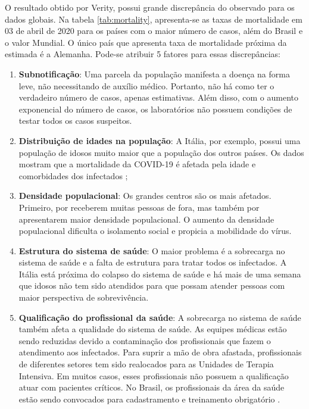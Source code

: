 \documentclass[12pt,a4papper]{article}
\begin{document}
O resultado obtido por Verity, possui grande discrepância do observado para os dados globais. Na tabela \ref{tab:mortality}, apresenta-se as taxas de mortalidade em 03 de abril de 2020 para os países com o maior número de casos, além do Brasil e o valor Mundial. O único país que apresenta taxa de mortalidade próxima da estimada é a Alemanha. Pode-se atribuir 5 fatores para essas discrepâncias:
\begin{enumerate}
    \item \textbf{Subnotificação}: Uma parcela da população manifesta a doença na forma leve, não necessitando de auxílio médico. Portanto, não há como ter o verdadeiro número de casos, apenas estimativas. Além disso, com o aumento exponencial do número de casos, os laboratórios não possuem condições de testar todos os casos suspeitos.
    \item \textbf{Distribuição de idades na população}: A Itália, por exemplo, possui uma população de idosos muito maior que a população dos outros países. Os dados mostram que a mortalidade da COVID-19 é afetada pela idade e comorbidades dos infectados \cite{wu2020characteristics};
    \item \textbf{Densidade populacional}: Os grandes centros são os mais afetados. Primeiro, por receberem muitas pessoas de fora, mas também por apresentarem maior densidade populacional. O aumento da densidade populacional dificulta o isolamento social e propicia a mobilidade do vírus.
    \item \textbf{Estrutura do sistema de saúde}: O maior problema é a sobrecarga no sistema de saúde e a falta de estrutura para tratar todos os infectados. A Itália está próxima do colapso do sistema de saúde \cite{armocida2020italian} e há mais de uma semana que idosos não tem sido atendidos para que possam atender pessoas com maior perspectiva de sobrevivência.
    \item \textbf{Qualificação do profissional da saúde}: A sobrecarga no sistema de saúde também afeta a qualidade do sistema de saúde. As equipes médicas estão sendo reduzidas devido a contaminação dos profissionais que fazem o atendimento aos infectados. Para suprir a mão de obra afastada, profissionais de diferentes setores tem sido realocados para as Unidades de Terapia Intensiva. Em muitos casos, esses profissionais não possuem a qualificação atuar com pacientes críticos. No Brasil, os profissionais da área da saúde estão sendo convocados para cadastramento e treinamento obrigatório \cite{chamamentoMS}.
\end{enumerate}{}
\end{document}
